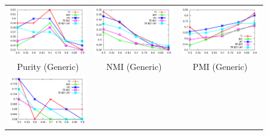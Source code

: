 \documentclass{sig-alternate}
\begin{document}
\begin{figure}[t!]
\begin{center}
\resizebox{17cm}{!} 
{
	\begin{tabular}{ccc}
		\includegraphics[width=200pt]{Figs/1-1.pdf} & 
		\includegraphics[width=200pt]{Figs/1-2.pdf} & 
		\includegraphics[width=200pt]{Figs/1-3.pdf} \\  
		{ Purity (Generic)} & { NMI (Generic)} & 
		{ PMI (Generic)}\\
		\includegraphics[width=200pt]{Figs/2-1.pdf} & 

\end{tabular}}
\end{center}
\end{figure}
\end{document}
